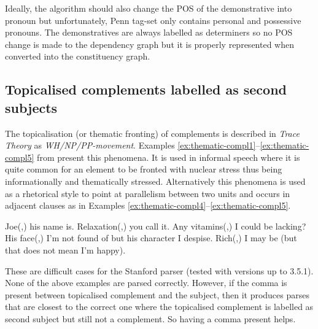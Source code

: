     Ideally, the algorithm should also change the POS of the demonstrative into pronoun but unfortunately, Penn tag-set only contains personal and possessive pronouns. The demonstratives are always labelled as determiners so no POS change is made to the dependency graph but it is properly represented when converted into the constituency graph.

\subsection{Topicalised complements labelled as second subjects}   
    The topicalisation (or thematic fronting) of complements is described in \textit{Trace Theory} as \textit{WH/NP/PP-movement}. Examples \ref{ex:thematic-compl1}--\ref{ex:thematic-compl5} from \citet[pp.~412-413]{Quirk1985} present this phenomena. It is used in informal speech where it is quite common for an element to be fronted with nuclear stress thus being informationally and thematically stressed. Alternatively this phenomena is used as a rhetorical style to point at parallelism between two units and occurs in adjacent clauses as in Examples \ref{ex:thematic-compl4}--\ref{ex:thematic-compl5}.

    \begin{exe}
    \ex\label{ex:thematic-compl1} Joe(,) his name is. 
    \ex\label{ex:thematic-compl2} Relaxation(,) you call it. 
    \ex\label{ex:thematic-compl3.5} Any vitamins(,) I could be lacking? 
    \ex\label{ex:thematic-compl4} His face(,) I'm not found of but his character I despise.
    \ex\label{ex:thematic-compl5} Rich(,) I may be (but that does not mean I'm happy).
    \end{exe}

    These are difficult cases for the Stanford parser (tested with versions up to 3.5.1). None of the above examples are parsed correctly. However, if the comma is present between topicalised complement and the subject, then it produces parses that are closest to the correct one where the topicalised complement is labelled as second subject but still not a complement. So having a comma present helps. 

